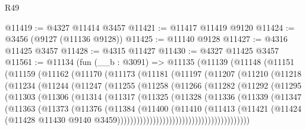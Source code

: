 \begin{lexlean}{R49}
\begin{coremodule}
@11419 := @4327 @11414 @3457
@11421 := @11417 @11419 @9120
@11424 := @3456 (@9127 (@11136 @9128))
@11425 := @11140 @9128
@11427 := @4316 @11425 @3457
@11428 := @4315 @11427
@11430 := @4327 @11425 @3457
@11561 := @11134
    (fun (__b : @3091) =>
    @11135
      (@11139
        (@11148
          (@11151
            (@11159
              (@11162
                (@11170
                  (@11173
                    (@11181
                      (@11197
                        (@11207
                          (@11210
                            (@11218
                              (@11234
                                (@11244
                                  (@11247
                                    (@11255
                                      (@11258
                                        (@11266
                                          (@11282
                                            (@11292
                                              (@11295
                                                (@11303
                                                  (@11306
                                                    (@11314
                                                      (@11317
                                                        (@11325
                                                          (@11328
                                                            (@11336
                                                              (@11339
                                                                (@11347
                                                                  (@11363
                                                                    (@11373
                                                                      (@11376
                                                                        (@11384
                                                                          (@11400
                                                                            (@11410
                                                                              (@11413
                                                                                (@11421
                                                                                  (@11424
                                                                                    (@11428
                                                                                      @11430
                                                                                      @9140
                                                                                      @3459)))))))))))))))))))))))))))))))))))))))))

\end{coremodule}
\end{lexlean}

